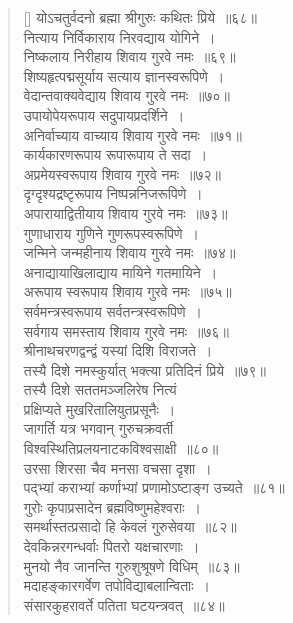 \documentclass[twoside,12pt,notitlepage]{book}
\begin{document}
\begin{verse}[\versewidth]
योऽचतुर्वदनो ब्रह्मा श्रीगुरुः कथितः प्रिये~॥६८॥\\
नित्याय निर्विकाराय निरवद्याय योगिने~।\\[-6pt]
निष्कलाय निरीहाय शिवाय गुरवे नमः~॥६९॥\\
शिष्यहृत्पद्मसूर्याय सत्याय ज्ञानस्वरूपिणे~।\\[-6pt]
वेदान्तवाक्यवेद्याय शिवाय गुरवे नमः~॥७०॥\\
उपायोपेयरूपाय सदुपायप्रदर्शिने~।\\[-6pt]
अनिर्वाच्याय वाच्याय शिवाय गुरवे नमः~॥७१॥\\
कार्यकारणरूपाय रूपारूपाय ते सदा~।\\[-6pt]
अप्रमेयस्वरूपाय शिवाय गुरवे नमः~॥७२॥\\
दृग्दृश्यद्रष्टृरूपाय निष्पन्ननिजरूपिणे~।\\[-6pt]
अपारायाद्वितीयाय शिवाय गुरवे नमः~॥७३॥\\
गुणाधाराय गुणिने गुणरूपस्वरूपिणे~।\\[-6pt]
जन्मिने जन्महीनाय शिवाय गुरवे नमः~॥७४॥\\
अनाद्यायाखिलाद्याय मायिने गतमायिने~।\\[-6pt]
अरूपाय स्वरूपाय शिवाय गुरवे नमः~॥७५॥\\
सर्वमन्त्रस्वरूपाय सर्वतन्त्रस्वरूपिणे~।\\[-6pt]
सर्वगाय समस्ताय शिवाय गुरवे नमः~॥७६॥\\
श्रीनाथचरणद्वन्द्वं यस्यां दिशि विराजते~।\\[-6pt]
तस्यै दिशे नमस्कुर्यात्  भक्त्या प्रतिदिनं प्रिये~॥७९॥\\
तस्यै दिशे सततमञ्जलिरेष नित्यं\\
प्रक्षिप्यते मुखरितालियुतप्रसूनैः~।\\[-6pt]
जागर्ति यत्र भगवान् गुरुचक्रवर्ती\\
विश्वस्थितिप्रलयनाटकविश्वसाक्षी~॥८०॥\\
उरसा शिरसा चैव मनसा वचसा दृशा~।\\[-6pt]
पद्‍भ्यां कराभ्यां कर्णाभ्यां प्रणामोऽष्टाङ्ग उच्यते~॥८१॥\\
गुरोः कृपाप्रसादेन ब्रह्मविष्णुमहेश्वराः~।\\[-6pt]
समर्थास्तत्प्रसादो हि केवलं गुरुसेवया~॥८२॥\\
देवकिन्नरगन्धर्वाः पितरो यक्षचारणाः~।\\[-6pt]
मुनयो नैव जानन्ति गुरुशुश्रूषणे विधिम्~॥८३॥\\
मदाहङ्कारगर्वेण तपोविद्याबलान्विताः~।\\[-6pt]
संसारकुहरावर्ते पतिता घटयन्त्रवत्~॥८४॥\\

\end{verse}
\end{document}
